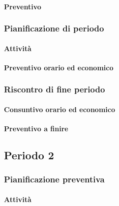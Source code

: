 \paragraph{Preventivo}

\subsubsection{Pianificazione di periodo}


\paragraph{Attività}



\paragraph{Preventivo orario ed economico}



\subsubsection{Riscontro di fine periodo}


\paragraph{Consuntivo orario ed economico}


\paragraph{Preventivo a finire}





\subsection{Periodo 2}

\subsubsection{Pianificazione preventiva}

\paragraph{Attività}

\planningTable{
	
}

